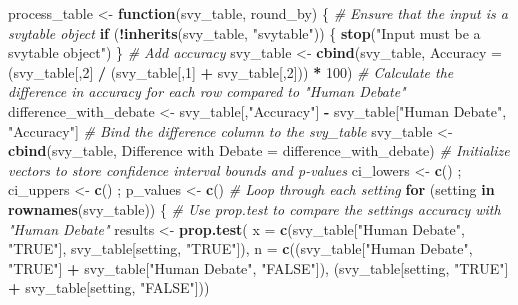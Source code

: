\documentclass[
]{article}
\newenvironment{Shaded}{\begin{snugshade}}{\end{snugshade}}
\newcommand{\AttributeTok}[1]{\textcolor[rgb]{0.13,0.29,0.53}{#1}}
\newcommand{\CommentTok}[1]{\textcolor[rgb]{0.56,0.35,0.01}{\textit{#1}}}
\newcommand{\ControlFlowTok}[1]{\textcolor[rgb]{0.13,0.29,0.53}{\textbf{#1}}}
\newcommand{\DecValTok}[1]{\textcolor[rgb]{0.00,0.00,0.81}{#1}}
\newcommand{\FunctionTok}[1]{\textcolor[rgb]{0.13,0.29,0.53}{\textbf{#1}}}
\newcommand{\NormalTok}[1]{#1}
\newcommand{\OtherTok}[1]{\textcolor[rgb]{0.56,0.35,0.01}{#1}}
\newcommand{\SpecialCharTok}[1]{\textcolor[rgb]{0.81,0.36,0.00}{\textbf{#1}}}
\newcommand{\StringTok}[1]{\textcolor[rgb]{0.31,0.60,0.02}{#1}}
\begin{document}
\begin{Shaded}
\begin{Highlighting}[]
\NormalTok{process\_table }\OtherTok{\textless{}{-}} \ControlFlowTok{function}\NormalTok{(svy\_table, round\_by) \{}
  \CommentTok{\# Ensure that the input is a svytable object}
  \ControlFlowTok{if}\NormalTok{ (}\SpecialCharTok{!}\FunctionTok{inherits}\NormalTok{(svy\_table, }\StringTok{"svytable"}\NormalTok{)) \{}
    \FunctionTok{stop}\NormalTok{(}\StringTok{"Input must be a svytable object"}\NormalTok{)}
\NormalTok{  \}}
  \CommentTok{\# Add accuracy}
\NormalTok{  svy\_table }\OtherTok{\textless{}{-}} \FunctionTok{cbind}\NormalTok{(svy\_table, }\AttributeTok{Accuracy =}\NormalTok{ (svy\_table[,}\DecValTok{2}\NormalTok{] }\SpecialCharTok{/}\NormalTok{ (svy\_table[,}\DecValTok{1}\NormalTok{] }\SpecialCharTok{+}\NormalTok{ svy\_table[,}\DecValTok{2}\NormalTok{])) }\SpecialCharTok{*} \DecValTok{100}\NormalTok{)}
  \CommentTok{\# Calculate the difference in accuracy for each row compared to "Human Debate"}
\NormalTok{  difference\_with\_debate }\OtherTok{\textless{}{-}}\NormalTok{ svy\_table[,}\StringTok{"Accuracy"}\NormalTok{] }\SpecialCharTok{{-}}\NormalTok{ svy\_table[}\StringTok{"Human Debate"}\NormalTok{, }\StringTok{"Accuracy"}\NormalTok{]}
  \CommentTok{\# Bind the difference column to the svy\_table}
\NormalTok{  svy\_table }\OtherTok{\textless{}{-}} \FunctionTok{cbind}\NormalTok{(svy\_table, }\StringTok{\textasciigrave{}}\AttributeTok{Difference with Debate}\StringTok{\textasciigrave{}} \OtherTok{=}\NormalTok{ difference\_with\_debate)}
  \CommentTok{\# Initialize vectors to store confidence interval bounds and p{-}values}
\NormalTok{  ci\_lowers }\OtherTok{\textless{}{-}} \FunctionTok{c}\NormalTok{() ; ci\_uppers }\OtherTok{\textless{}{-}} \FunctionTok{c}\NormalTok{() ; p\_values }\OtherTok{\textless{}{-}} \FunctionTok{c}\NormalTok{()}
  \CommentTok{\# Loop through each setting}
  \ControlFlowTok{for}\NormalTok{ (setting }\ControlFlowTok{in} \FunctionTok{rownames}\NormalTok{(svy\_table)) \{}
    \CommentTok{\# Use prop.test to compare the setting\textquotesingle{}s accuracy with "Human Debate"}
\NormalTok{    results }\OtherTok{\textless{}{-}} \FunctionTok{prop.test}\NormalTok{(}
      \AttributeTok{x =} \FunctionTok{c}\NormalTok{(svy\_table[}\StringTok{"Human Debate"}\NormalTok{, }\StringTok{"TRUE"}\NormalTok{], svy\_table[setting, }\StringTok{"TRUE"}\NormalTok{]),}
      \AttributeTok{n =} \FunctionTok{c}\NormalTok{((svy\_table[}\StringTok{"Human Debate"}\NormalTok{, }\StringTok{"TRUE"}\NormalTok{] }\SpecialCharTok{+}\NormalTok{ svy\_table[}\StringTok{"Human Debate"}\NormalTok{, }\StringTok{"FALSE"}\NormalTok{]), (svy\_table[setting, }\StringTok{"TRUE"}\NormalTok{] }\SpecialCharTok{+}\NormalTok{ svy\_table[setting, }\StringTok{"FALSE"}\NormalTok{]))}

\end{Highlighting}
\end{Shaded}
\end{document}
